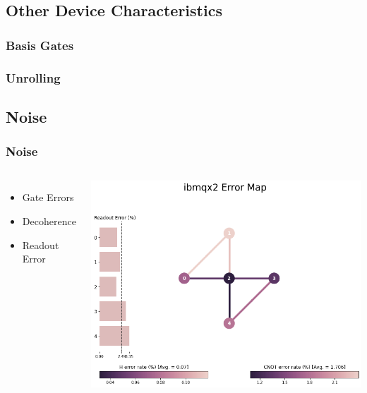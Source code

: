 \documentclass[aspectratio=169,11pt,hyperref={colorlinks=true}]{beamer}
\begin{document}
\subsection{Other Device Characteristics}
\begin{frame}
    \frametitle{Basis Gates}

\end{frame}
\begin{frame}
    \frametitle{Unrolling}

\end{frame}
\subsection{Noise}
\begin{frame}
    \frametitle{Noise}
    \begin{columns}
            \begin{itemize}
                \item Gate Errors
                \item Decoherence
                \item Readout Error
            \end{itemize}
            \includegraphics[width=\textwidth]{error_map.png}
    \end{columns}
\end{frame}
\end{document}
